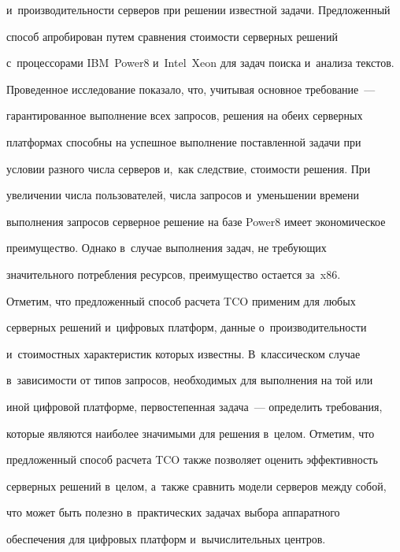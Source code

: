 и~про\-из\-во\-ди\-тель\-ности серверов при решении известной задачи. Предложенный 

способ апробирован путем сравнения сто\-и\-мости серверных решений 

с~процессорами IBM~Power8 и~Intel~Xeon для задач поиска и~анализа текстов. 

  

  Проведенное исследование показало, что, учитывая основное требование~--- 

гарантированное выполнение всех запросов, решения на обеих серверных 

платформах способны на успешное выполнение поставленной задачи при 

условии разного числа серверов и,~как следствие, сто\-и\-мости решения. При 

увеличении числа пользователей, чис\-ла запросов и~уменьшении времени 

выполнения запросов серверное решение на базе Power8 имеет экономическое 

преимущество. Однако в~случае выполнения задач, не тре\-бу\-ющих 

значительного потребления ресурсов, преимущество остается за~x86.

  

  Отметим, что предложенный способ расчета TCO применим для любых 

серверных решений и~цифровых платформ, данные о~производительности 

и~стоимостных характеристик которых известны. В~классическом случае 

в~за\-ви\-си\-мости от типов запросов, необходимых для выполнения на той или 

иной циф\-ро\-вой платформе, первостепенная задача~--- определить требования, 

которые являются наиболее значимыми для решения в~целом. Отметим, что 

предложенный способ расчета TCO также позволяет оценить эффективность 

серверных решений в~целом, а~также сравнить модели серверов меж\-ду собой, 

что может быть полезно в~практических задачах выбора аппаратного 

обеспечения для циф\-ро\-вых плат\-форм и~вы\-чис\-ли\-тель\-ных цент\-ров.

  

